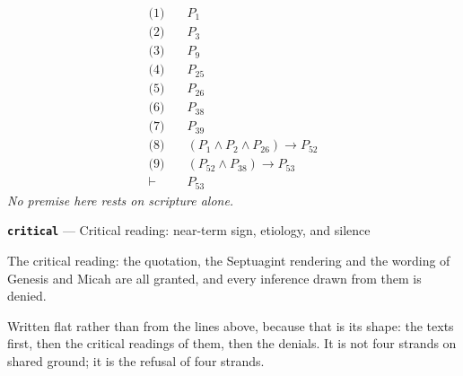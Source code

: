\documentclass[11pt]{article}
\begin{document}
\begin{align*}
  \text{(1)} \quad & P_{1} \\
  \text{(2)} \quad & P_{3} \\
  \text{(3)} \quad & P_{9} \\
  \text{(4)} \quad & P_{25} \\
  \text{(5)} \quad & P_{26} \\
  \text{(6)} \quad & P_{38} \\
  \text{(7)} \quad & P_{39} \\
  \text{(8)} \quad & (P_{1} \land P_{2} \land P_{26}) \rightarrow P_{52} \\
  \text{(9)} \quad & (P_{52} \land P_{38}) \rightarrow P_{53} \\
  \vdash \quad & P_{53}
\end{align*}
\emph{No premise here rests on scripture alone.}
\par\medskip\noindent\textbf{\texttt{critical}} --- Critical reading: near-term sign, etiology, and silence\par\nobreak\noindent
The critical reading: the quotation, the Septuagint rendering and the wording of Genesis and Micah are all granted, and every inference drawn from them is denied.

Written flat rather than from the lines above, because that is its shape: the texts first, then the critical readings of them, then the denials. It is not four strands on shared ground; it is the refusal of four strands.
\end{document}
